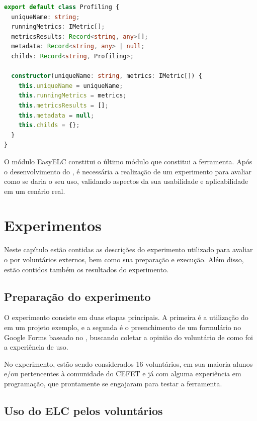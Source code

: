 \documentclass[12pt]{tcc}
\begin{document}
\begin{lstlisting}[label={lst:easyelc_profiling_class}, caption={Implementação do nó da árvore de análises usado no EasyElc.}, language=TypeScript, breaklines=true]
export default class Profiling {
  uniqueName: string;
  runningMetrics: IMetric[];
  metricsResults: Record<string, any>[];
  metadata: Record<string, any> | null;
  childs: Record<string, Profiling>;

  constructor(uniqueName: string, metrics: IMetric[]) {
    this.uniqueName = uniqueName;
    this.runningMetrics = metrics;
    this.metricsResults = [];
    this.metadata = null;
    this.childs = {};
  }
}
\end{lstlisting}

	O módulo EasyELC constitui o último módulo que constitui a ferramenta. Após o desenvolvimento do , é necessária a realização de um experimento para avaliar como se daria o seu uso, validando aspectos da sua usabilidade e aplicabilidade em um cenário real.

\chapter{Experimentos}
	\label{cap:experimentos}

	Neste capítulo estão contidas as descrições do experimento utilizado para avaliar o  por voluntários externos, bem como sua preparação e execução. Além disso, estão contidos também os resultados do experimento.

	\section{Preparação do experimento}
	\label{section:preparacao-experimento}

	O experimento consiste em duas etapas principais. A primeira é a utilização do  em um projeto exemplo, e a segunda é o preenchimento de um formulário no Google Forms baseado no , buscando coletar a opinião do voluntário de como foi a experiência de uso.

	No experimento, estão sendo considerados 16 voluntários, em sua maioria alunos e/ou pertencentes à comunidade do CEFET e já com alguma experiência em programação, que prontamente se engajaram para testar a ferramenta. 


	\section{Uso do ELC pelos voluntários}
	\label{section:parte-1-experimento}
\end{document}
